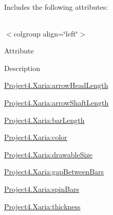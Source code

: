 Includes the following attributes\+:

\tabulinesep=1mm
\begin{longtabu} spread 0pt [c]{*{0}{|X[-1]}|}
\hline
\end{longtabu}
$<$colgroup align=\char`\"{}left\char`\"{}$>$ 

Attribute

Description 

{\ttfamily \hyperlink{classproject4_1_1xaria_1_1R_1_1styleable_a457594739477bbef860905dc8962ed87}{Project4.\+Xaria\+:arrow\+Head\+Length}}

{\ttfamily \hyperlink{classproject4_1_1xaria_1_1R_1_1styleable_a49fc6620d696930dca13977825e4fc11}{Project4.\+Xaria\+:arrow\+Shaft\+Length}}

{\ttfamily \hyperlink{classproject4_1_1xaria_1_1R_1_1styleable_a5812c605567372cd810d538d94b94d2f}{Project4.\+Xaria\+:bar\+Length}}

{\ttfamily \hyperlink{classproject4_1_1xaria_1_1R_1_1styleable_a5ca52cb75917a6d3666d5120613e3f97}{Project4.\+Xaria\+:color}}

{\ttfamily \hyperlink{classproject4_1_1xaria_1_1R_1_1styleable_a9c3f73891dd5a4d60247e34fefb8c47a}{Project4.\+Xaria\+:drawable\+Size}}

{\ttfamily \hyperlink{classproject4_1_1xaria_1_1R_1_1styleable_a8d472cd739b04305b3402c6232122cb4}{Project4.\+Xaria\+:gap\+Between\+Bars}}

{\ttfamily \hyperlink{classproject4_1_1xaria_1_1R_1_1styleable_a677c43a06f3156ddaadcaf41f4a5f63a}{Project4.\+Xaria\+:spin\+Bars}}

{\ttfamily \hyperlink{classproject4_1_1xaria_1_1R_1_1styleable_ada3e7dfa18bdce491e278c71b0c30013}{Project4.\+Xaria\+:thickness}}

